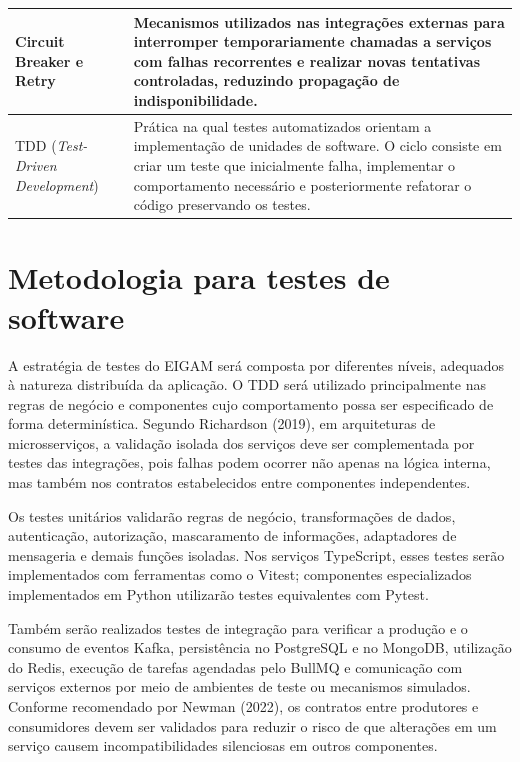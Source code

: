 {\begin{longtable}{|p{4.5cm}|p{10cm}|}
Circuit Breaker e Retry & Mecanismos utilizados nas integrações externas para interromper temporariamente chamadas a serviços com falhas recorrentes e realizar novas tentativas controladas, reduzindo propagação de indisponibilidade. \\ \hline
TDD (\textit{Test-Driven Development}) & Prática na qual testes automatizados orientam a implementação de unidades de software. O ciclo consiste em criar um teste que inicialmente falha, implementar o comportamento necessário e posteriormente refatorar o código preservando os testes. \\ \hline

\end{longtable}
}


\section{Metodologia para testes de software}

A estratégia de testes do EIGAM será composta por diferentes níveis, adequados à natureza distribuída da aplicação. O TDD será utilizado principalmente nas regras de negócio e componentes cujo comportamento possa ser especificado de forma determinística. Segundo Richardson (2019), em arquiteturas de microsserviços, a validação isolada dos serviços deve ser complementada por testes das integrações, pois falhas podem ocorrer não apenas na lógica interna, mas também nos contratos estabelecidos entre componentes independentes.

Os testes unitários validarão regras de negócio, transformações de dados, autenticação, autorização, mascaramento de informações, adaptadores de mensageria e demais funções isoladas. Nos serviços TypeScript, esses testes serão implementados com ferramentas como o Vitest; componentes especializados implementados em Python utilizarão testes equivalentes com Pytest.

Também serão realizados testes de integração para verificar a produção e o consumo de eventos Kafka, persistência no PostgreSQL e no MongoDB, utilização do Redis, execução de tarefas agendadas pelo BullMQ e comunicação com serviços externos por meio de ambientes de teste ou mecanismos simulados. Conforme recomendado por Newman (2022), os contratos entre produtores e consumidores devem ser validados para reduzir o risco de que alterações em um serviço causem incompatibilidades silenciosas em outros componentes.

